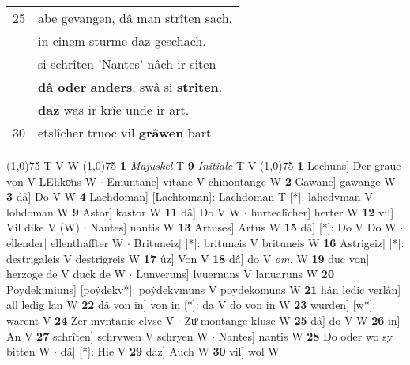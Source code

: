 \documentclass[8pt,a4paper,notitlepage]{article}
\begin{document}
\begin{table}[ht]
\begin{minipage}[t]{0.5\linewidth}
\begin{tabular}{rl}
25 & abe gevangen, dâ man strîten sach.\\ 
 & in einem sturme daz geschach.\\ 
 & si schrîten 'Nantes' nâch ir siten\\ 
 & \textbf{dâ oder} \textbf{anders}, swâ si \textbf{striten}.\\ 
 & \textbf{daz} was ir krîe unde ir art.\\ 
30 & etslîcher truoc vil \textbf{grâwen} bart.\\ 
\end{tabular}
\scriptsize
\line(1,0){75} \newline
T V W \newline
\line(1,0){75} \newline
\textbf{1} \textit{Majuskel} T  \textbf{9} \textit{Initiale} T V  \newline
\line(1,0){75} \newline
\textbf{1} Lechuns] Der graue von V LEhkoͤns W  $\cdot$ Emuntane] vitane V chinontange W \textbf{2} Gawane] gawange W \textbf{3} dâ] Do V W \textbf{4} Lachdoman] [Lachtoman]: Lachdoman T [*]: lahedvman V lohdoman W \textbf{9} Astor] kastor W \textbf{11} dâ] Do V W  $\cdot$ hurteclîcher] herter W \textbf{12} vil] Vil dike V (W)  $\cdot$ Nantes] nantis W \textbf{13} Artuses] Artus W \textbf{15} dâ] [*]: Do V Do W  $\cdot$ ellender] ellenthaffter W  $\cdot$ Brituneiz] [*]: brituneis V brituneis W \textbf{16} Astrigeiz] [*]: destrigaleis V destrigreis W \textbf{17} ûz] Von V \textbf{18} dâ] do V \textit{om.} W \textbf{19} duc von] herzoge de V duck de W  $\cdot$ Lunveruns] lvuernuns V lanuaruns W \textbf{20} Poydekuniuns] [poẏdekv*]: poẏdekvmuns V poydekomuns W \textbf{21} hân ledic verlân] all ledig lan W \textbf{22} dâ von in] von in [*]: da V do von in W \textbf{23} wurden] [w*]: warent V \textbf{24} Zer mvntanie clvse V  $\cdot$ Zuͦ montange kluse W \textbf{25} dâ] do V W \textbf{26} in] An V \textbf{27} schrîten] schrvwen V schryen W  $\cdot$ Nantes] nantis W \textbf{28} Do oder wo sy bitten W  $\cdot$ dâ] [*]: Hie V \textbf{29} daz] Auch W \textbf{30} vil] wol W \newline
\end{minipage}
\end{table}
\end{document}
